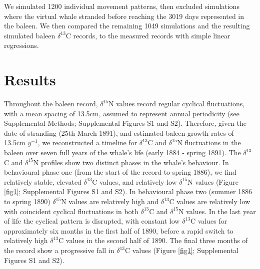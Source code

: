\documentclass[a4paper,12pt]{article}
\begin{document}
 We simulated 1200 individual movement patterns, then excluded simulations where the virtual whale stranded before reaching the 3019 days represented in the baleen.
We then compared the remaining 1049 simulations and the resulting simulated baleen $\delta^{13}$C records, to the measured records with simple linear regressions. 

\section{Results}


Throughout the baleen record, $\delta^{15}$N values record regular cyclical fluctuations, with a mean spacing of 13.5cm, assumed to represent annual periodicity (see Supplemental Methods; Supplemental Figures S1 and S2). 
Therefore, given the date of stranding (25th March 1891), and estimated baleen growth rates of 13.5cm $y^{-1}$, we reconstructed a timeline for $\delta^{13}$C and $\delta^{15}$N fluctuations in the baleen over seven full years of the whale's life (early 1884 - spring 1891). 
The $\delta^{13}$C and $\delta^{15}$N profiles show two distinct phases in the whale's behaviour. 
In behavioural phase one (from the start of the record to spring 1886), we find relatively stable, elevated $\delta^{13}$C values, and relatively low $\delta^{15}$N values (Figure \ref{fig1}; Supplemental Figures S1 and S2). 
In behavioural phase two (summer 1886 to spring 1890) $\delta^{15}$N values are relatively high and $\delta^{13}$C values are relatively low with coincident cyclical fluctuations in both $\delta^{13}$C and $\delta^{15}$N values. 
In the last year of life the cyclical pattern is disrupted, with constant low $\delta^{13}$C values for approximately six months in the first half of 1890, before a rapid switch to relatively high $\delta^{13}$C values in the second half of 1890. 
The final three months of the record show a progressive fall in $\delta^{13}$C values (Figure \ref{fig1}; Supplemental Figures S1 and S2).
\end{document}
